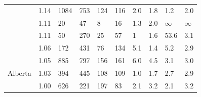 \documentclass[utf8]{FrontiersinHarvard} %
\begin{document}
\begin{table}[h!]
\begin{ssmall}
\begin{tabular}{llllllllll}
			\cite{Yan:2021aa}                & 1.14      & 1084                                 & 753                                     & 124                          & 116                                        & 2.0       & 1.8       & 1.2       & 2.0       \\
			\cite{Chen:2023aa}               & 1.11      & 20                                   & 47                                      & 8                            & 16                                         & 1.3       & 2.0       & $\infty$  & $\infty$  \\
			\cite{Leal:2020aa}               & 1.11      & 50                                   & 270                                     & 25                           & 57                                         & 1         & 1.6       & 53.6      & 3.1       \\
			\cite{Perez-Losada:2017aa}       & 1.06      & 172                                  & 431                                     & 76                           & 134                                        & 5.1       & 1.4       & 5.2       & 2.9       \\
			\cite{liu_dynamics_2020}         & 1.05      & 885                                  & 797                                     & 156                          & 161                                        & 6.0       & 4.5       & 3.1       & 3.0       \\ %
			\cite{chato_public_2020} Alberta & 1.03      & 394                                  & 445                                     & 108                          & 109                                        & 1.0       & 1.7       & 2.7       & 2.9       \\
			\cite{Fabeni:2020aa}             & 1.00      & 626                                  & 221                                     & 197                          & 83                                         & 2.1       & 3.2       & 2.1       & 3.2       \\

			\hline
		\end{tabular}
	\end{ssmall}
\end{table}
\end{document}
